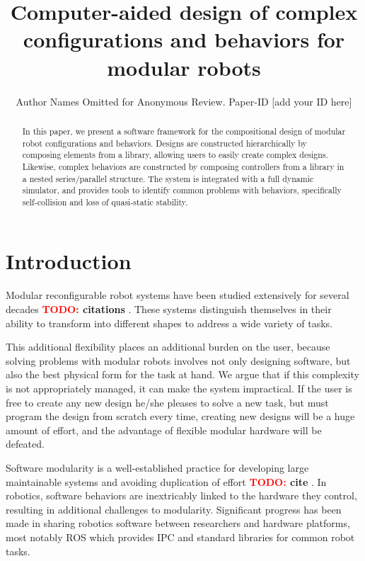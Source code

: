 \documentclass[conference]{IEEEtran}
\theoremstyle{definition}
\newcommand{\TODO}[1]{ {\bf \textcolor{red}{TODO:} #1 }}
\begin{document}
\title{Computer-aided design of complex configurations and behaviors for modular robots}

\author{Author Names Omitted for Anonymous Review. Paper-ID [add your ID here]}

\maketitle

\begin{abstract}
In this paper, we present a software framework for the compositional design of
modular robot configurations and behaviors. Designs are constructed
hierarchically by composing elements from a library, allowing users to easily
create complex designs.  Likewise, complex behaviors are constructed by
composing controllers from a library in a nested series/parallel structure. The
system is integrated with a full dynamic simulator, and provides tools to
identify common problems with behaviors, specifically self-collision and loss
of quasi-static stability.

\end{abstract}

\section{Introduction}
Modular reconfigurable robot systems have been studied extensively for several
decades \TODO{citations}.  These systems distinguish themselves in their
ability to transform into different shapes to address a wide variety of tasks.

This additional flexibility places an additional burden on the user, because
solving problems with modular robots involves not only designing  software,
but also the best physical form for the task at hand. We argue that if this
complexity is not appropriately managed, it can make the system
impractical. If the user is free to create any new design he/she pleases to
solve a new task, but must program the design from scratch every time, creating
new designs will be a huge amount of effort, and the advantage of flexible modular
hardware will be defeated.

Software modularity is a well-established practice for developing large
maintainable systems and avoiding duplication of effort \TODO{cite}. In robotics, software
behaviors are inextricably linked to the hardware they control, resulting in
additional challenges to modularity. Significant progress has been made in
sharing robotics software between researchers
and hardware platforms, most notably
ROS which provides IPC and standard libraries for common robot tasks. 
\end{document}
